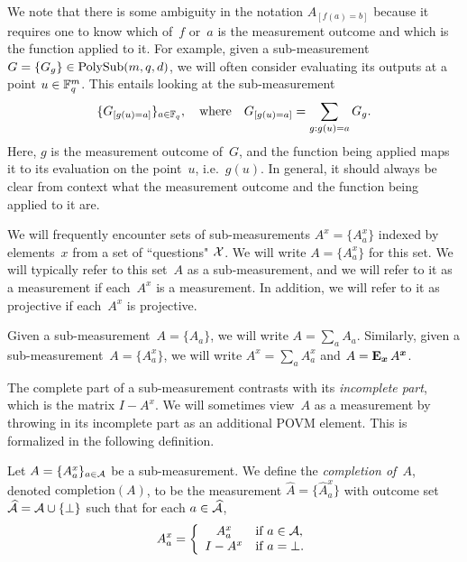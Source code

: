 \begin{remark}
We note that there is some ambiguity in the notation $A_{[f(a)=b]}$
because it requires one to know which of~$f$ or~$a$ is the measurement outcome
and which is the function applied to it.
For example, given a sub-measurement $G = \{G_g\} \in \mathrm{PolySub}(m, q, d)$,
we will often consider evaluating its outputs at a point $u \in \mathbb F_q^m$.
This entails looking at the sub-measurement
\begin{equation*}
\{G_{[g(u)=a]}\}_{a \in \mathbb F_q},
\quad
\text{where}
\quad
G_{[g(u)=a]} = \sum_{g:g(u) = a} G_g.
\end{equation*}
Here, $g$ is the measurement outcome of~$G$,
and the function being applied maps it to its evaluation on the point~$u$, i.e.\ $g(u)$.
In general, it should always be clear from context
what the measurement outcome and the function being applied to it are.
\end{remark}

\begin{notation}
We will frequently encounter sets of sub-measurements $A^x= \{A^x_{a}\}$ indexed by elements~$x$ from a set of ``questions" $\mathcal{X}$. We will write $A = \{A^x_a\}$ for this set. 
We will typically refer to this set~$A$ as a sub-measurement,
and we will refer to it as a measurement if each~$A^x$ is a measurement.
In addition, we will refer to it as projective if each~$A^x$ is projective.
\end{notation}

\begin{notation}
Given a sub-measurement~$A = \{A_a\}$, we will write $A = \sum_a A_a$.
Similarly, given a sub-measurement~$A = \{A^x_a\}$, we will write $A^x = \sum_a A^x_a$ and $A = \mathop{\bf E\/}_{{\boldsymbol{x}}} A^{{\boldsymbol{x}}}$.
\end{notation}

The complete part of a sub-measurement
contrasts with its \emph{incomplete part},
which is the matrix $I - A^x$.
We will sometimes
view~$A$ as a measurement
by throwing in its incomplete part as an additional POVM element.
This is formalized in the following definition.


\begin{definition}\label{def:measurement-completion}
Let $A = \{A^x_a\}_{a \in \mathcal{A}}$ be a sub-measurement.
We define the \emph{completion of~$A$},
denoted $\mathrm{completion}(A)$,
to be the measurement $\widehat{A} = \{\widehat{A}^x_a\}$
with outcome set $\widehat{\mathcal{A}} = \mathcal{A} \cup \{\bot\}$ 
such that for each $a \in \widehat{\mathcal{A}}$,
\begin{equation*}
A^x_a
= \left\{\begin{array}{cl}
		A^x_a & \text{if $a \in \mathcal{A}$,}\\
		I - A^x & \text{if $a = \bot$}.
		\end{array}\right.
\end{equation*}
\end{definition}

